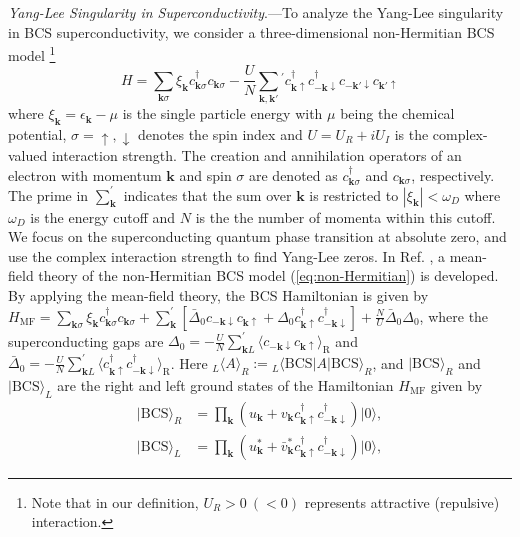 \documentclass[aps,prl,twocolumn,nofootinbib,superscriptaddress,notitlepage,longbibliography]{revtex4-1}
\begin{document}
	\emph{Yang-Lee Singularity in Superconductivity}.---To analyze the Yang-Lee singularity in BCS superconductivity, we consider a three-dimensional non-Hermitian BCS model \cite{Yamamoto2019}\footnote{Note that in our definition, $U_{R}>0\:(<0)$ represents attractive (repulsive) interaction.} 
	\begin{equation}
	H=\sum_{\boldsymbol{k}\sigma}\xi_{\boldsymbol{k}}c_{\boldsymbol{k}\sigma}^{\dagger}c_{\boldsymbol{k}\sigma}-\frac{U}{N}\sum_{\bm{k},\bm{k}'}{}^{'}c_{\bm{k}\uparrow}^{\dagger}c_{\bm{-k}\downarrow}^{\dagger}c_{\bm{-k}'\downarrow}c_{\bm{k}'\uparrow}\label{eq:non-Hermitian}
	\end{equation}
	where $\xi_{\boldsymbol{k}}=\epsilon_{\bm{k}}-\mu$ is the single particle energy with $\mu$ being the chemical potential, $\sigma=\uparrow,\downarrow$ denotes the spin index and $U=U_R+iU_I$ is the complex-valued interaction  strength. The creation and annihilation operators of an electron with momentum $\bm{k}$ and spin $\sigma$ are denoted as $c_{\bm{k}\sigma}^\dag$ and $c_{\bm{k}\sigma}$, respectively. The prime in $\sum_{\bm{k}}^{'}$ indicates that the sum over $\bm{k}$ is restricted to  $|\xi_{\boldsymbol{k}}|<\omega_D$ where $\omega_D$ is the energy cutoff and $N$ is the the number of momenta within this cutoff. We focus on the superconducting quantum phase transition at absolute zero, and use the complex interaction strength to find Yang-Lee zeros. In Ref. \cite{Yamamoto2019}, a mean-field theory of the non-Hermitian BCS model (\ref{eq:non-Hermitian}) is developed. %
	By applying the mean-field theory, the BCS Hamiltonian is given by $H_{\mathrm{MF}}=\sum_{\boldsymbol{k}\sigma}\xi_{\boldsymbol{k}}c_{\boldsymbol{k}\sigma}^{\dagger}c_{\boldsymbol{k}\sigma}+\sum_{\bm{k}}^{'}[\bar{\Delta}_0c_{-\bm{k}\downarrow}c_{\bm{k}\uparrow}+\Delta_0 c_{\bm{k}\uparrow}^{\dagger}c_{-\bm{k}\downarrow}^{\dagger}]+\frac{N}{U}\bar{\Delta}_0\Delta_0$, where the superconducting gaps are $\Delta_{0}=-\frac{U}{N}\sum_{\boldsymbol{k}L}^{'}\langle c_{-\boldsymbol{k}\downarrow}c_{\boldsymbol{k}\uparrow}\rangle_{\mathrm{R}}$ and $\bar{\Delta}_{0}=-\frac{U}{N}\sum_{\boldsymbol{k}L}^{'}\langle c_{\boldsymbol{k}\uparrow}^{\dagger}c_{-\boldsymbol{k}\downarrow}^{\dagger}\rangle_{\mathrm{R}}$. Here ${}_L\langle A\rangle_{R}:={}_L\langle \text{BCS}|A|\text{BCS}\rangle_R$, and $|\text{BCS}\rangle_{R}$ and $|\text{BCS}\rangle_{L}$ are the right and left ground states of the Hamiltonian $H_{\mathrm{MF}}$ given by \cite{Yamamoto2019}
	\begin{align}
		|\text{BCS}\rangle_{R}&=\prod_{\bm{k}}(u_{\bm{k}}+v_{\bm{k}}c_{\boldsymbol{k}\uparrow}^{\dagger}c_{-\boldsymbol{k}\downarrow}^{\dagger})|0\rangle,\\
		|\text{BCS}\rangle_{L}&=\prod_{\bm{k}}(u^{*}_{\bm{k}}+\bar{v}^{*}_{\bm{k}}c_{\boldsymbol{k}\uparrow}^{\dagger}c_{-\boldsymbol{k}\downarrow}^{\dagger})|0\rangle,
	\end{align}
\end{document}

